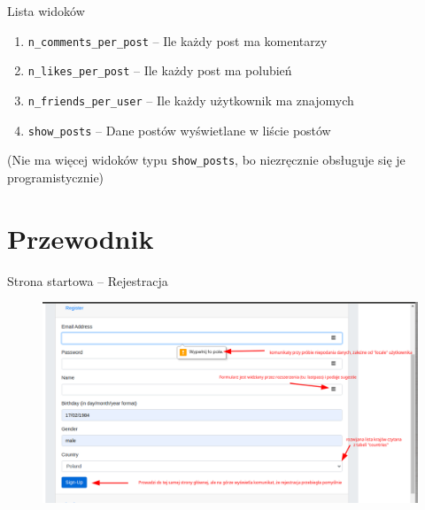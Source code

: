 \documentclass[handout]{beamer}
\begin{document}
        \begin{frame}[fragile]{Lista widoków}
            \begin{enumerate}
                \item \verb|n_comments_per_post| -- Ile każdy post ma komentarzy \pause
                \item \verb|n_likes_per_post| -- Ile każdy post ma polubień \pause
                \item \verb|n_friends_per_user| -- Ile każdy użytkownik ma znajomych \pause
                \item \verb|show_posts| -- Dane postów wyświetlane w liście postów \pause
            \end{enumerate}
            
            (Nie ma więcej widoków typu \verb|show_posts|, bo niezręcznie obsługuje się je programistycznie)
        \end{frame}
    \section{Przewodnik}
        
        \begin{frame}[fragile]{Strona startowa -- Rejestracja}
            \begin{figure}
                \centering
                \includegraphics[width=\linewidth]{welcome_page_register.png}
            \end{figure}
        \end{frame}
        
\end{document}
